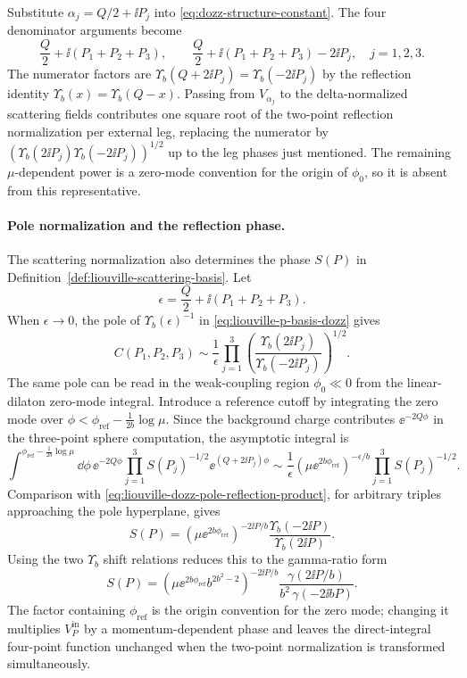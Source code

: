 Substitute \(\alpha_j=Q/2+\ii P_j\) into
\eqref{eq:dozz-structure-constant}.  The four denominator arguments become
\[
  \frac Q2+\ii(P_1+P_2+P_3),\qquad
  \frac Q2+\ii(P_1+P_2+P_3)-2\ii P_j,\quad j=1,2,3.
\]
The numerator factors are
\(\Upsilon_b(Q+2\ii P_j)=\Upsilon_b(-2\ii P_j)\) by the reflection identity
\(\Upsilon_b(x)=\Upsilon_b(Q-x)\).  Passing from \(V_{\alpha_j}\) to the
delta-normalized scattering fields contributes one square root of the
two-point reflection normalization per external leg, replacing the numerator
by
\(\left(\Upsilon_b(2\ii P_j)\Upsilon_b(-2\ii P_j)\right)^{1/2}\) up to the
leg phases just mentioned.  The remaining \(\mu\)-dependent power is a
zero-mode convention for the origin of \(\phi_0\), so it is absent from this
representative.

\paragraph{Pole normalization and the reflection phase.}
\label{par:liouville-pole-normalization-reflection}
The scattering normalization also determines the phase \(S(P)\) in
Definition~\ref{def:liouville-scattering-basis}.  Let
\[
  \epsilon=\frac Q2+\ii(P_1+P_2+P_3).
\]
When \(\epsilon\to0\), the pole of
\(\Upsilon_b(\epsilon)^{-1}\) in
\eqref{eq:liouville-p-basis-dozz} gives
\begin{equation}
  C(P_1,P_2,P_3)
  \sim
  \frac1{\epsilon}
  \prod_{j=1}^3
  \left(
    \frac{\Upsilon_b(2\ii P_j)}
         {\Upsilon_b(-2\ii P_j)}
  \right)^{1/2}.
  \label{eq:liouville-dozz-pole-reflection-product}
\end{equation}
The same pole can be read in the weak-coupling region
\(\phi_0\ll0\) from the linear-dilaton zero-mode integral.  Introduce a
reference cutoff by integrating the zero mode over
\(\phi<\phi_{\mathrm{ref}}-\frac1{2b}\log\mu\).  Since the background charge
contributes \(\ee^{-2Q\phi}\) in the three-point sphere computation, the
asymptotic integral is
\[
  \int^{\phi_{\mathrm{ref}}-\frac1{2b}\log\mu}
  \dd\phi\,
  \ee^{-2Q\phi}
  \prod_{j=1}^3
  S(P_j)^{-1/2}\ee^{(Q+2\ii P_j)\phi}
  \sim
  \frac1\epsilon
  \left(\mu\ee^{2b\phi_{\mathrm{ref}}}\right)^{-\epsilon/b}
  \prod_{j=1}^3 S(P_j)^{-1/2}.
\]
Comparison with
\eqref{eq:liouville-dozz-pole-reflection-product}, for arbitrary triples
approaching the pole hyperplane, gives
\begin{equation}
  S(P)
  =
  \left(\mu\ee^{2b\phi_{\mathrm{ref}}}\right)^{-2\ii P/b}
  \frac{\Upsilon_b(-2\ii P)}{\Upsilon_b(2\ii P)} .
  \label{eq:liouville-reflection-phase-upsilon}
\end{equation}
Using the two \(\Upsilon_b\) shift relations reduces this to the gamma-ratio
form
\begin{equation}
  S(P)
  =
  \left(\mu\ee^{2b\phi_{\mathrm{ref}}} b^{2b^2-2}\right)^{-2\ii P/b}
  \frac{\gamma(2\ii P/b)}
       {b^2\,\gamma(-2\ii bP)} .
  \label{eq:liouville-reflection-phase-gamma}
\end{equation}
The factor containing \(\phi_{\mathrm{ref}}\) is the origin convention for the
zero mode; changing it multiplies \(V_P^{\mathrm{in}}\) by a momentum-dependent
phase and leaves the direct-integral four-point function unchanged when the
two-point normalization is transformed simultaneously.

